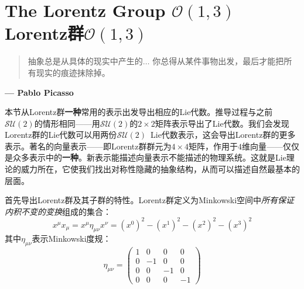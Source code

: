 \section[Lorentz群]{The Lorentz Group $\mathcal{O}(1, 3)$ \quad Lorentz群$\mathcal{O}(1, 3)$}
\label{sec3.7}

\begin{quote}
抽象总是从具体的现实中产生的$\dots$ 你总得从某件事物出发，最后才能把所有现实的痕迹抹除掉。
\end{quote}

\begin{flushright}
{\bfseries  --- Pablo Picasso}
\end{flushright}

本节从Lorentz群{\bfseries 一种}常用的表示出发导出相应的Lie代数。推导过程与之前$\mathcal{SU}(2)$的情形相同——用$\mathcal{SU}(2)$的$2 \times 2$矩阵表示导出了Lie代数。我们会发现Lorentz群的Lie代数可以用两份$\mathcal{SU}(2)$\ Lie代数表示，这会导出Lorentz群的更多表示。著名的向量表示——即Lorentz群群元为$4 \times 4$矩阵，作用于$4$维向量——仅仅是众多表示中的{\bfseries 一种}。新表示能描述向量表示不能描述的物理系统。这就是Lie理论的威力所在，它使我们找出对称性隐藏的抽象结构，从而可以描述自然最基本的层面。

首先导出Lorentz群及其子群的特性。Lorentz群定义为Minkowski空间中{\itshape 所有保证内积不变的变换}组成的集合：
\begin{equation}
\label{equ3.122}
x^\mu x_\mu = x^\mu \eta_{\mu \nu} x^\nu = (x^0)^2 - (x^1)^2 - (x^2)^2 - (x^3)^2
\end{equation}
其中$\eta_{\mu \nu}$表示Minkowski度规：
\begin{equation}
\label{equ3.123}
\eta_{\mu \nu} =
	\begin{pmatrix}
		1 & 0 & 0 & 0 \\
		0 & -1 & 0 & 0 \\
		0 & 0 & -1 & 0 \\
		0 & 0 & 0 & -1
	\end{pmatrix}
\end{equation}

